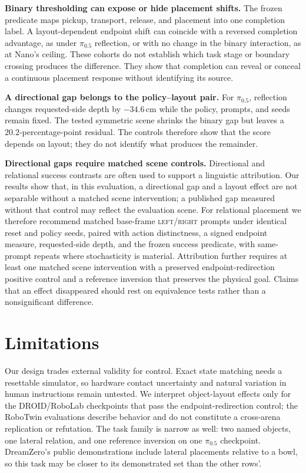 \documentclass[letterpaper,10pt,conference]{ieeeconf}%
\newcommand{\tokLR}{\textsc{left}/\textsc{right}}
\newcommand{\tightparagraph}[1]{\vspace{0.25em}\noindent\textbf{#1}}
\begin{document}
\tightparagraph{Binary thresholding can expose or hide placement shifts.}
The frozen predicate maps pickup, transport, release, and placement into one completion label.
A layout-dependent endpoint shift can coincide with a reversed completion advantage, as under $\pi_{0.5}$ reflection, or with no change in the binary interaction, as at Nano's ceiling.
These cohorts do not establish which task stage or boundary crossing produces the difference.
They show that completion can reveal or conceal a continuous placement response without identifying its source.

\tightparagraph{A directional gap belongs to the policy--layout pair.}
For $\pi_{0.5}$, reflection changes requested-side depth by $-34.6$\,cm while the policy, prompts, and seeds remain fixed.
The tested symmetric scene shrinks the binary gap but leaves a $20.2$-percentage-point residual.
The controls therefore show that the score depends on layout; they do not identify what produces the remainder.

\tightparagraph{Directional gaps require matched scene controls.}
Directional and relational success contrasts are often used to support a linguistic attribution.
Our results show that, in this evaluation, a directional gap and a layout effect are not separable without a matched scene intervention; a published gap measured without that control may reflect the evaluation scene.
For relational placement we therefore recommend matched base-frame \tokLR{} prompts under identical reset and policy seeds, paired with action distinctness, a signed endpoint measure, requested-side depth, and the frozen success predicate, with same-prompt repeats where stochasticity is material.
Attribution further requires at least one matched scene intervention with a preserved endpoint-redirection positive control and a reference inversion that preserves the physical goal.
Claims that an effect disappeared should rest on equivalence tests rather than a nonsignificant difference.

\section{Limitations}
\label{sec:limitations}

Our design trades external validity for control.
Exact state matching needs a resettable simulator, so hardware contact uncertainty and natural variation in human instructions remain untested.
We interpret object-layout effects only for the DROID/RoboLab checkpoints that pass the endpoint-redirection control; the RoboTwin evaluations describe behavior and do not constitute a cross-arena replication or refutation.
The task family is narrow as well: two named objects, one lateral relation, and one reference inversion on one $\pi_{0.5}$ checkpoint.
DreamZero's public demonstrations include lateral placements relative to a bowl, so this task may be closer to its demonstrated set than the other rows'.
\end{document}
